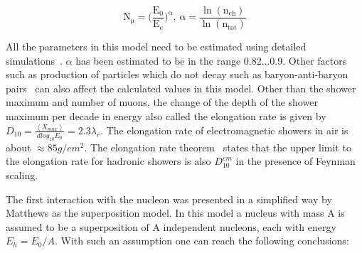\begin{equation}
    \mathrm{N_{\mu} = \biggl(\frac{E_0}{E_c}\biggr)^{\alpha} , \, \alpha = \frac{\ln (n_{ch})}{\ln (n_{tot})}}
\end{equation}

All the parameters in this model need to be estimated using detailed simulations~\cite{PhysRevD.66.033011}. $\alpha$ has been estimated to be in the range 0.82...0.9. Other factors such as production of particles which do not decay such as baryon-anti-baryon pairs~\cite{ Pierog:2006qv} can also affect the calculated values in this model. Other than the shower maximum and number of muons, the change of the depth of the shower maximum per decade in energy also called the elongation rate is given by $D_{10} = \frac{\left\langle X_{max}\right\rangle }{dlog_{10}E_0} = 2.3\lambda_r$. The elongation rate of electromagnetic showers in air is about $\approx 85g/cm^2$. The elongation rate theorem~\cite{Linsley_1977} states that the upper limit to the elongation rate for hadronic showers is also $D_{10}^{em}$ in the presence of Feynman scaling.

The first interaction with the nucleon was presented in a simplified way by Matthews as the superposition model. In this model a nucleus with mass A is assumed to be a superposition of A independent nucleons, each with energy $E_h = E_0/A$. With such an assumption one can reach the following conclusions:

